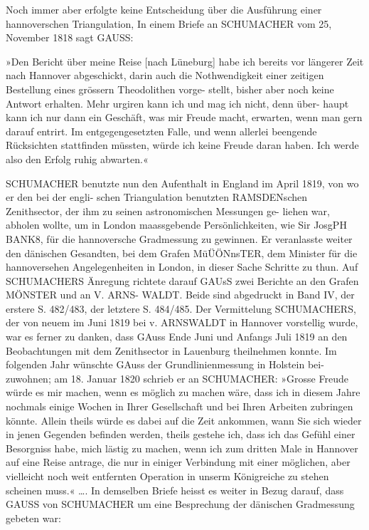 \documentclass[12pt,a4paper]{article}
\theoremstyle{plain}
\theoremstyle{definition}
\theoremstyle{remark}
\begin{document}
\noindent

\noindent
Noch immer aber erfolgte keine Entscheidung über die Ausführung einer hannoverschen Triangulation,
In einem Briefe an SCHUMACHER vom 25, November 1818 sagt GAUSS:

\noindent
»Den Bericht über meine Reise [nach Lüneburg] habe ich bereits vor längerer Zeit nach Hannover
abgeschickt, darin auch die Nothwendigkeit einer zeitigen Bestellung eines grössern Theodolithen vorge-
stellt, bisher aber noch keine Antwort erhalten. Mehr urgiren kann ich und mag ich nicht, denn über-
haupt kann ich nur dann ein Geschäft, was mir Freude macht, erwarten, wenn man gern darauf entrirt.
Im entgegengesetzten Falle, und wenn allerlei beengende Rücksichten stattfinden müssten, würde ich keine
Freude daran haben. Ich werde also den Erfolg ruhig abwarten.«

\noindent
SCHUMACHER benutzte nun den Aufenthalt in England im April 1819, von wo er den bei der engli-
schen Triangulation benutzten RAMSDENschen Zenithsector, der ihm zu seinen astronomischen Messungen ge-
liehen war, abholen wollte, um in London maassgebende Persönlichkeiten, wie Sir JosgPH BANK8, für die
hannoversche Gradmessung zu gewinnen. Er veranlasste weiter den dänischen Gesandten, bei dem Grafen
MüÜÖNnsTER, dem Minister für die hannoversehen Angelegenheiten in London, in dieser Sache Schritte zu thun.
Auf SCHUMACHERS Änregung richtete darauf GAUsS zwei Berichte an den Grafen MÖNSTER und an V. ARNS-
WALDT. Beide sind abgedruckt in Band IV, der erstere S. 482/483, der letztere S. 484/485. Der Vermittelung
SCHUMACHERS, der von neuem im Juni 1819 bei v. ARNSWALDT in Hannover vorstellig wurde, war es ferner
zu danken, dass GAuss Ende Juni und Anfangs Juli 1819 an den Beobachtungen mit dem Zenithsector in
Lauenburg theilnehmen konnte. Im folgenden Jahr wünschte GAuss der Grundlinienmessung in Holstein bei-
zuwohnen; am 18. Januar 1820 schrieb er an SCHUMACHER: »Grosse Freude würde es mir machen, wenn
es möglich zu machen wäre, dass ich in diesem Jahre nochmals einige Wochen in Ihrer Gesellschaft und
bei Ihren Arbeiten zubringen könnte. Allein theils würde es dabei auf die Zeit ankommen, wann Sie sich
wieder in jenen Gegenden befinden werden, theils gestehe ich, dass ich das Gefühl einer Besorgniss habe,
mich lästig zu machen, wenn ich zum dritten Male in Hannover auf eine Reise antrage, die nur in einiger
Verbindung mit einer möglichen, aber vielleicht noch weit entfernten Operation in unserm Königreiche
zu stehen scheinen muss.« \ldots. In demselben Briefe heisst es weiter in Bezug darauf, dass GAUSS von
SCHUMACHER um eine Besprechung der dänischen Gradmessung gebeten war:
\end{document}
